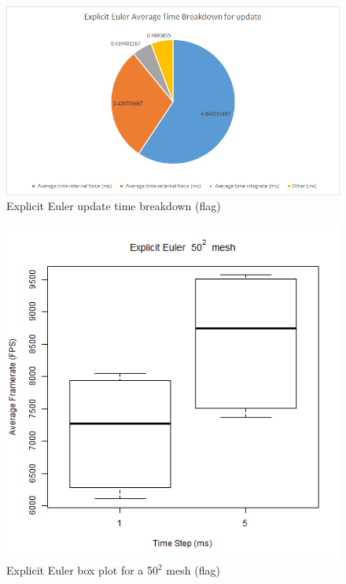     \begin{figure}
    \begin{center}
      \includegraphics[scale=.9]{Figures/flag_ee_ut}
    \end{center}
    \caption{Explicit Euler update time breakdown (flag)}
    \label{fig:ee ut flag}
  \end{figure}
  
    \begin{figure}
    \begin{center}
      \includegraphics[scale=.9]{Figures/flag_ee_50_box}
    \end{center}
    \caption{Explicit Euler box plot for a 50$^{2}$ mesh (flag)}
    \label{fig:ee box 50 flag}
  \end{figure}
  
